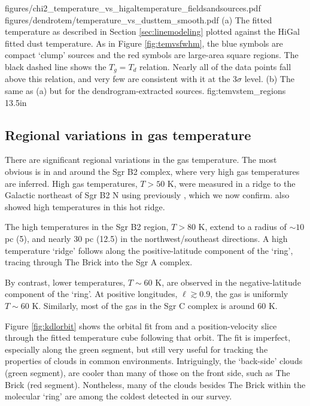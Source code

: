 \FigureTwo
{figures/chi2_temperature_vs_higaltemperature_fieldsandsources.pdf}
{figures/dendrotem/temperature_vs_dusttem_smooth.pdf} %
{(a) The fitted temperature as described in Section \ref{sec:linemodeling} plotted
against the HiGal fitted dust temperature.  As in Figure \ref{fig:temvsfwhm},
the blue symbols are compact `clump' sources and the red symbols are large-area
square regions.  The black dashed line shows the $T_g = T_d$ relation.  Nearly
all of the data points fall above this relation, and very few are consistent
with it at the 3$\sigma$ level.
(b) The same as (a) but for the dendrogram-extracted sources.
}
{fig:temvstem_regions}
{1}{3.5in}

\subsection{Regional variations in gas temperature}
There are significant regional variations in the gas temperature.  The most
obvious is in and around the Sgr B2 complex, where very high gas temperatures
are inferred.  High gas temperatures, $T>50$ K, were measured in a ridge to the
Galactic northeast of Sgr B2 N using \methylcyanide previously \citep[][Figure
4b]{de-Vicente1997a}, which we now confirm.  \citet{Ott2014a} also showed high
\ammonia temperatures in this hot ridge.

The high temperatures in the Sgr B2 region, $T>80$ K, extend to a radius of
$\sim10$ pc (5\arcmin), and nearly 30 pc (12.5\arcmin) in the
northwest/southeast directions.  A high temperature `ridge' follows along the
positive-latitude component of the \citet{Molinari2011a} `ring', tracing
through The Brick into the Sgr A complex.

By contrast, lower temperatures, $T\sim60$ K, are observed in the
negative-latitude component of the `ring'.  At positive longitudes,
$\ell\gtrsim0.9$, the gas is uniformly $T\sim60$ K.  Similarly, most of the gas
in the Sgr C complex is around 60 K.

Figure \ref{fig:kdlorbit} shows the orbital fit from \citet{Kruijssen2014d} and
a position-velocity slice through the fitted temperature cube following that
orbit.  The fit is imperfect, especially along the green segment, but still very useful
for tracking the properties of clouds in common environments.
Intriguingly, the `back-side' clouds (green segment), are cooler than
many of those on the front side, such as The Brick (red segment).  Nontheless,
many of the clouds besides The Brick within the molecular `ring' are among the
coldest detected in our survey.

